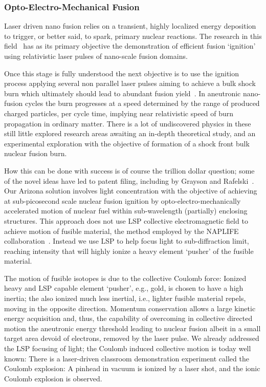\documentclass[particles,article,accept,pdftex,moreauthors]{Definitions/mdpi}
\begin{document}
 \subsubsection{Opto-Electro-Mechanical Fusion}\label{sssec:optoelecmechFusion}
Laser driven nano fusion relies on a transient, highly localized energy deposition to trigger, or better said, to spark, primary nuclear reactions. The research in this field~\cite{Kroo:2025HighField,Biro:2025EPJ,Csernai:2025EPJ,Kedves:2025EPJ} has as its primary objective the demonstration of efficient fusion `ignition' using relativistic laser pulses of nano-scale fusion domains. 

Once this stage is fully understood the next objective is to use the ignition process applying several non parallel laser pulses aiming to achieve a bulk shock burn which ultimately should lead to abundant fusion yield~\cite{Csernai:2026MDPI,Biro:2023Univ}. In aneutronic nano-fusion cycles the burn progresses at a speed determined by the range of produced charged particles, per cycle time, implying near relativistic speed of burn propagation in ordinary matter. There is a lot of undiscovered physics in these still little explored research areas awaiting an in-depth theoretical study, and an experimental exploration with the objective of formation of a shock front bulk nuclear fusion burn. 

How this can be done with success is of course the trillion dollar question; some of the novel ideas have led to patent filing, including by Grayson and Rafelski~\cite{ChGJR2025patent}. Our Arizona solution involves light concentration with the objective of achieving at sub-picosecond scale nuclear fusion ignition by opto-electro-mechanically accelerated motion of nuclear fuel within sub-wavelength (partially) enclosing structures. This approach does not use LSP collective electromagnetic field to achieve motion of fusible material, the method employed by the NAPLIFE collaboration~\cite{Kroo:2025HighField,Biro:2025EPJ,Csernai:2025EPJ,Kedves:2025EPJ}. Instead we use LSP to help focus light to sub-diffraction limit, reaching intensity that will highly ionize a heavy element `pusher' of the fusible material.

The motion of fusible isotopes is due to the collective Coulomb force: Ionized heavy and LSP capable element `pusher', e.g., gold, is chosen to have a high inertia; the also ionized much less inertial, i.e., lighter fusible material repels, moving in the opposite direction. Momentum conservation allows a large kinetic energy acquisition and, thus, the capability of overcoming in collective directed motion the aneutronic energy threshold leading to nuclear fusion albeit in a small target area devoid of electrons, removed by the laser pulse. We already addressed the LSP focusing of light; the Coulomb induced collective motion is today well known: There is a laser-driven classroom demonstration experiment called the Coulomb explosion: A pinhead in vacuum is ionized by a laser shot, and the ionic Coulomb explosion is observed.
\end{document}
